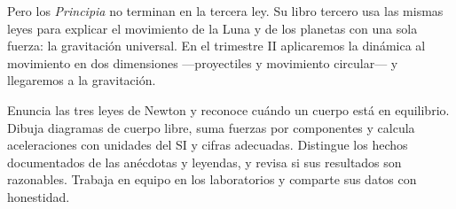 \documentclass[11pt]{article}
\begin{document}
Pero los \emph{Principia} no terminan en la tercera ley. Su libro tercero usa las mismas leyes
para explicar el movimiento de la Luna y de los planetas con una sola fuerza: la gravitación
universal. En el trimestre II aplicaremos la dinámica al movimiento en dos dimensiones
---proyectiles y movimiento circular--- y llegaremos a la gravitación.

\matrizevaluacion
  {Enuncia las tres leyes de Newton y reconoce cuándo un cuerpo está en equilibrio.}
  {Dibuja diagramas de cuerpo libre, suma fuerzas por componentes y calcula aceleraciones con unidades del SI y cifras adecuadas.}
  {Distingue los hechos documentados de las anécdotas y leyendas, y revisa si sus resultados son razonables.}
  {Trabaja en equipo en los laboratorios y comparte sus datos con honestidad.}

\autoevaluacion

\seguimientodocente
\end{document}
